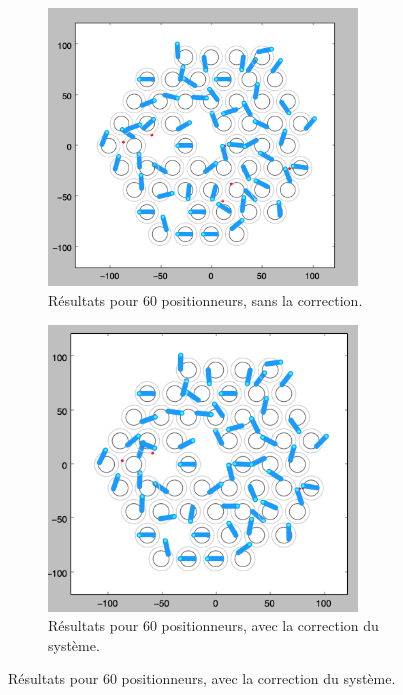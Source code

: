 \begin{figure}[h]
\begin{center}
	\begin{subfigure}{0.49\textwidth}
		\includegraphics[width=0.9\textwidth]{set_target/sans_correction.png}
		\caption{Résultats pour 60 positionneurs, sans la correction.}
		\label{fig:correction:normal}
	\end{subfigure}
	\begin{subfigure}{0.49\textwidth}
		\includegraphics[width=0.9\textwidth]{set_target/correction.png}
		\caption{Résultats pour 60 positionneurs, avec la correction du système.}
		\label{fig:correction:normal}
	\end{subfigure}
	

\end{center}
\end{figure}
